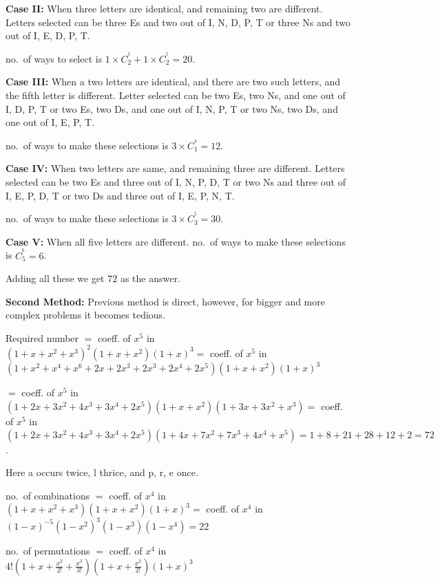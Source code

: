   {\bf Case II:} When three letters are identical, and remaining two are different. Letters selected can be
  three E\symbol[rightquote]s and two out of I, N, D, P, T or three N\symbol[rightquote]s and two out of I,
  E, D, P, T.

  no.\ of ways to select is $1\times C_2^^5 + 1\times C_2^^5 = 20$.

  {\bf Case III:} When a two letters are identical, and there are two such letters, and the fifth letter is
  different. Letter selected can be two E\symbol[rightquote]s, two N\symbol[rightquote]s, and one out of I,
  D, P, T or two E\symbol[rightquote]s, two D\symbol[rightquote]s, and one out of I, N, P, T or two
  N\symbol[rightquote]s, two D\symbol[rightquote]s, and one out of I, E, P, T.

  no.\ of ways to make these selections is $3\times C_1^^4 = 12$.

  {\bf Case IV:} When two letters are same, and remaining three are different. Letters selected can be two
  E\symbol[rightquote]s and three out of I, N, P, D, T or two N\symbol[rightquote]s and three out of I, E,
  P, D, T or two D\symbol[rightquote]s and three out of I, E, P, N, T.

  no.\ of ways to make these selections is $3\times C_3^^5 = 30$.

  {\bf Case V:} When all five letters are different. no.\ of ways to make these selections is $C_5^^6 = 6$.

  Adding all these we get $72$ as the answer.

  {\bf Second Method:} Previous method is direct, however, for bigger and more complex problems it becomes
  tedious.

  Required number $=$ coeff. of $x^5$ in $(1 + x + x^2 + x^3)^2(1 + x + x^2)(1 + x)^3 =$ coeff. of $x^5$ in
  $(1 + x^2 + x^4 + x^6 + 2x + 2x^3 + 2x^3 + 2x^4 + 2x^5)(1 + x + x^2)(1 + x)^3$

  $=$ coeff. of $x^5$ in $(1 + 2x + 3x^2 + 4x^3 + 3x^4 + 2x^5)(1 + x + x^2)(1 + 3x + 3x^2 + x^3) =$
  coeff. of $x^5$ in $(1 + 2x + 3x^2 + 4x^3 + 3x^4 + 2x^5)(1 + 4x + 7x^2 + 7x^3 + 4x^4 + x^5) = 1 + 8 + 21 +
  28 + 12 + 2 = 72$.
\item Here a occurs twice, l thrice, and p, r, e once.

  no.\ of combinations $=$ coeff. of $x^4$ in $(1 + x + x^2 + x^3)(1 + x + x^2)(1 + x)^3 =$ coeff. of $x^4$
  in $(1 - x)^{-5}(1 - x^2)^3(1 - x^3)(1 - x^4) = 22$

  no.\ of permutations $=$ coeff. of $x^4$ in $4!\left(1 + x + \frac{x^2}{2!} + \frac{x^3}{3!}\right)\left(1 + x +
  \frac{x^2}{2!}\right)(1 + x)^3$

